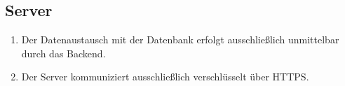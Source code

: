 \subsection*{Server}

\begin{samepage}
    \begin{enumerate}[label=\textbf{/NFS\arabic*0/}, align=left, start=8]
        \item Der \Gls{Datenaustausch} mit der \Gls{Datenbank} erfolgt ausschließlich unmittelbar durch das \Gls{Backend}.
        \item Der \Gls{Server} kommuniziert ausschließlich verschlüsselt über \Gls{HTTPS}.
    \end{enumerate}
\end{samepage}